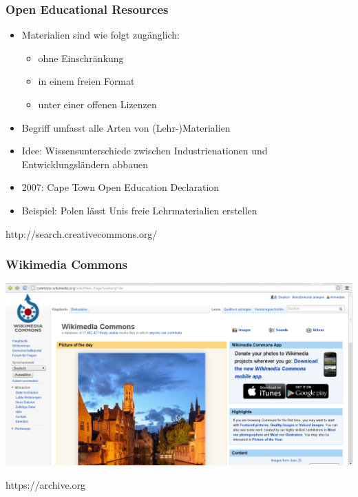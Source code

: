 \documentclass[table]{beamer}
\begin{document}
\begin{frame}
  \frametitle{Open Educational Resources}
    \begin{itemize}
        \item<2-> Materialien sind wie folgt zugänglich:
            \begin{itemize}
                \item<3-> ohne Einschränkung
                \item<4-> in einem freien Format
                \item<5-> unter einer offenen Lizenzen 
            \end{itemize}
        \item<6-> Begriff umfasst alle Arten von (Lehr-)Materialien
        \item<7-> Idee: Wissensunterschiede zwischen Industrienationen und Entwicklungsländern abbauen
        \item<8-> 2007: Cape Town Open Education Declaration
        \item<9-> Beispiel: Polen lässt Unis freie Lehrmaterialien erstellen
    \end{itemize}
\end{frame}

\begin{frame}
    \begin{center}\Large
      http://search.creativecommons.org/
    \end {center}
\end{frame}

\begin{frame}
  \frametitle{Wikimedia Commons}
  \includegraphics[width=\textwidth]{img/wikicommons.png}
\end{frame}

\begin{frame}
    \begin{center}\Large
      https://archive.org
    \end {center}
\end{frame}
\end{document}
